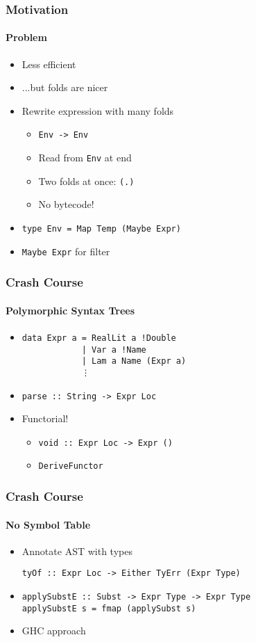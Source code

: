 \documentclass{beamer}
\begin{document}
\begin{frame}[fragile]
  \frametitle{Motivation}
  \framesubtitle{Problem}
  \begin{itemize}
    \item Less efficient
    \item ...but folds are nicer
    \item Rewrite expression with many folds
      \begin{itemize}
        \item \verb|Env -> Env|
        \item Read from \verb|Env| at end
        \item Two folds at once: \verb|(.)|
        \item No bytecode!
      \end{itemize}
    \item
      \begin{verbatim}
type Env = Map Temp (Maybe Expr)
      \end{verbatim}
    \item \verb|Maybe Expr| for filter
  \end{itemize}
\end{frame}

\begin{frame}[fragile]
  \frametitle{Crash Course}
  \framesubtitle{Polymorphic Syntax Trees}
    \begin{itemize}
      \item
      \begin{verbatim}
data Expr a = RealLit a !Double
            | Var a !Name
            | Lam a Name (Expr a)
            ⋮
\end{verbatim}
      \item \verb|parse :: String -> Expr Loc|
      \item Functorial!
        \begin{itemize}
          \item \verb|void :: Expr Loc -> Expr ()|
          \item \verb|DeriveFunctor|
        \end{itemize}
    \end{itemize}
\end{frame}

\begin{frame}[fragile]
  \frametitle{Crash Course}
  \framesubtitle{No Symbol Table}
  \begin{itemize}
      \item Annotate AST with types
        \begin{verbatim}
tyOf :: Expr Loc -> Either TyErr (Expr Type)
        \end{verbatim}
      \item
        \begin{verbatim}
applySubstE :: Subst -> Expr Type -> Expr Type
applySubstE s = fmap (applySubst s)
        \end{verbatim}
      \item GHC approach
  \end{itemize}
\end{frame}
\end{document}

